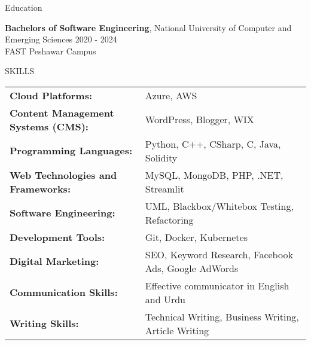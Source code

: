 \documentclass{resume}
\begin{document}





\begin{rSection}{Education}

{\bf Bachelors of Software Engineering}, National University of Computer and Emerging Sciences  \hfill {2020 - 2024}\\
FAST Peshawar Campus

\end{rSection}




\begin{rSection}{SKILLS}

\begin{tabular}{ @{} >{\bfseries}l @{\hspace{6ex}} l }
Cloud Platforms: & Azure, AWS \\
Content Management Systems (CMS): & WordPress, Blogger, WIX \\
Programming Languages: & Python, C++, CSharp, C, Java, Solidity \\
Web Technologies and Frameworks: & MySQL, MongoDB, PHP, .NET, Streamlit \\
Software Engineering: & UML, Blackbox/Whitebox Testing, Refactoring \\
Development Tools: & Git, Docker, Kubernetes \\
Digital Marketing: & SEO, Keyword Research, Facebook Ads, Google AdWords \\
Communication Skills: & Effective communicator in English and Urdu  \\
Writing Skills: & Technical Writing, Business Writing, Article Writing \\
\end{tabular}

\end{rSection}
\end{document}
